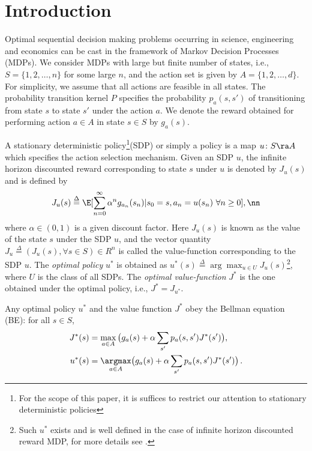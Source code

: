 \section{Introduction}
Optimal sequential decision making problems occurring in science, engineering and economics can be cast in the framework of Markov Decision Processes (MDPs). We consider MDPs with large but finite number of states, i.e., $S=\{1,2,\ldots,n\}$ for some large $n$, and the action set is given by $A=\{1,2,\ldots,d\}$. For simplicity, we assume that all actions are feasible in all states. The probability transition kernel $P$ specifies the probability $p_a(s,s')$ of transitioning from state $s$ to state $s'$ under the action $a$. We denote the reward obtained for performing action $a\in A$ in state $s\in S$ by $g_a(s)$.\par
A stationary deterministic policy\footnote{For the scope of this paper, it is suffices to restrict our attention to stationary deterministic policies}(SDP) or simply a policy is a map $u\colon S\ra A$ which specifies the action selection mechanism. Given an SDP $u$, the infinite horizon discounted reward corresponding to state $s$ under $u$ is denoted by $J_u(s)$ and is defined by
\begin{align}
J_u(s)\stackrel{\Delta}{=}\E[\sum_{n=0}^\infty \alpha^n g_{a_n}(s_n)|s_0=s,a_n=u(s_n)\mbox{ }\forall n\geq 0],\nn
\end{align}
where $\alpha \in (0,1)$ is a given discount factor. Here $J_u(s)$ is known as the value of the state $s$ under the SDP $u$, and the vector quantity $J_u\stackrel{\Delta}{=}(J_u(s), \forall s\in S)\in R^n$ is called the value-function corresponding to the SDP $u$. The \emph{optimal policy} $u^*$ is obtained as $u^*(s)\stackrel{\Delta}{=}\arg\max_{u\in U}J_u(s)$\footnote{Such $u^*$ exists and is well defined in the case of infinite horizon discounted reward MDP, for more details see \cite{Puter}.}, where $U$ is the class of all SDPs. The \emph{optimal value-function} $J^*$ is the one obtained under the optimal policy, i.e., $J^*=J_{u^*}$.\par
Any optimal policy $u^*$ and the value function $J^*$ obey the Bellman equation (BE): for all $ s \in S$, 
\begin{subequations}\label{bell}
\begin{align}
\label{bellval}J^*(s)&=\max_{ a\in A}\big(g_a(s)+\alpha \sum_{s'}p_a(s,s')J^*(s')\big),\\
\label{bellpol}u^*(s)&= \underset{a\in A}{\argmax}\big(g_a(s)+\alpha \sum_{s'}p_a(s,s')J^*(s')\big)\,.
\end{align}
\end{subequations}
